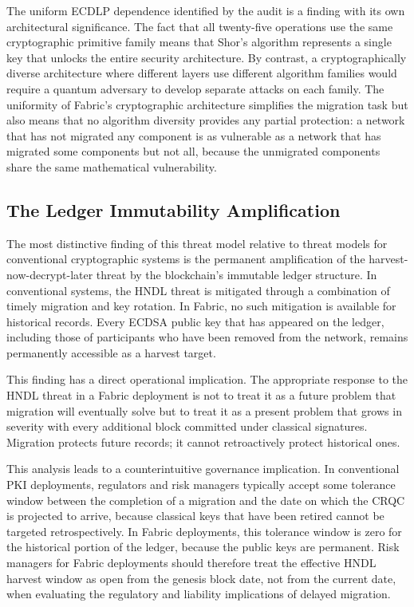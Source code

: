 \documentclass[conference]{IEEEtran}
\begin{document}
The uniform ECDLP dependence identified by the audit is a finding with
its own architectural significance. The fact that all twenty-five
operations use the same cryptographic primitive family means that Shor's
algorithm represents a single key that unlocks the entire security
architecture. By contrast, a cryptographically diverse architecture
where different layers use different algorithm families would require a
quantum adversary to develop separate attacks on each family. The
uniformity of Fabric's cryptographic architecture simplifies the
migration task but also means that no algorithm diversity provides any
partial protection: a network that has not migrated any component is
as vulnerable as a network that has migrated some components but not
all, because the unmigrated components share the same mathematical
vulnerability.

\subsection{The Ledger Immutability Amplification}

The most distinctive finding of this threat model relative to threat
models for conventional cryptographic systems is the permanent
amplification of the harvest-now-decrypt-later threat by the blockchain's
immutable ledger structure. In conventional systems, the HNDL threat is
mitigated through a combination of timely migration and key rotation. In
Fabric, no such mitigation is available for historical records. Every
ECDSA public key that has appeared on the ledger, including those of
participants who have been removed from the network, remains permanently
accessible as a harvest target.

This finding has a direct operational implication. The appropriate
response to the HNDL threat in a Fabric deployment is not to treat it
as a future problem that migration will eventually solve but to treat it
as a present problem that grows in severity with every additional block
committed under classical signatures. Migration protects future records;
it cannot retroactively protect historical ones.

This analysis leads to a counterintuitive governance implication. In
conventional PKI deployments, regulators and risk managers typically
accept some tolerance window between the completion of a migration and
the date on which the CRQC is projected to arrive, because classical
keys that have been retired cannot be targeted retrospectively. In Fabric
deployments, this tolerance window is zero for the historical portion of
the ledger, because the public keys are permanent. Risk managers for
Fabric deployments should therefore treat the effective HNDL harvest
window as open from the genesis block date, not from the current date,
when evaluating the regulatory and liability implications of delayed
migration.
\end{document}
